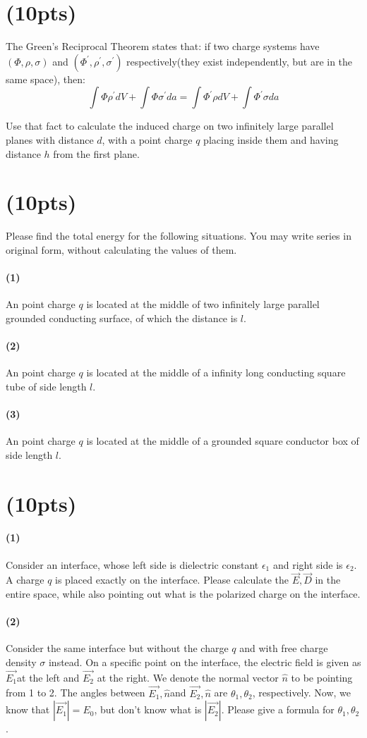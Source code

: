 \documentclass{article}
\begin{document}
\section{(10pts)}
The Green's Reciprocal Theorem states that: if two charge systems have $(\Phi,\rho,\sigma)$ and $(\Phi^\prime,\rho^\prime,\sigma^\prime)$ respectively(they exist independently, but are in the same space), then:$$\int \Phi\rho^\prime dV+\int \Phi\sigma^\prime da=\int \Phi^\prime\rho dV+\int \Phi^\prime\sigma da$$

Use that fact to calculate the induced charge on two infinitely large parallel planes with distance $d$, with a point charge $q$ placing inside them and having distance $h$ from the first plane.
\section{(10pts)}
Please find the total energy for the following situations. You may write series in original form, without calculating the values of them.
\paragraph{(1)} An point charge $q$ is located at the middle of two infinitely large parallel grounded conducting surface, of which the distance is $l$.
\paragraph{(2)} An point charge $q$ is located at the middle of a infinity long conducting square tube of side length $l$.
\paragraph{(3)} An point charge $q$ is located at the middle of a grounded square conductor box of side length $l$.
\section{(10pts)}
\paragraph{(1)}Consider an interface, whose left side is dielectric constant $\epsilon_1$ and right side is $\epsilon_2$. A charge $q$ is placed exactly on the interface. Please calculate the $\overrightarrow{E},\overrightarrow{D}$ in the entire space, while also pointing out what is the polarized charge on the interface.
\paragraph{(2)} Consider the same interface but without the charge $q$ and with free charge density $\sigma$ instead. On a specific point on the interface, the electric field is given as $\overrightarrow{E_1}$at the left and $\overrightarrow{E_2}$ at the right. We denote the normal vector $\hat{n}$ to be pointing from 1 to 2. The angles between $\overrightarrow{E_1},\hat{n}$and $\overrightarrow{E_2},\hat{n}$ are $\theta_1,\theta_2$, respectively. Now, we know that $|\overrightarrow{E_1}|=E_0$, but don't know what is $|\overrightarrow{E_2}|$. Please give a formula for $\theta_1,\theta_2$.
\end{document}
